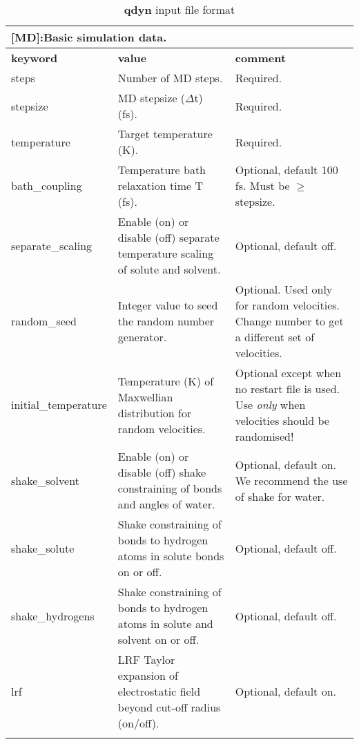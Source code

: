 \documentclass[a4paper,10pt]{article}
\begin{document}
\begin{longtable}{|p{78pt}|p{158pt}|p{158pt}|}
\caption{\textbf{qdyn} input file format}
\label{tab:qdyninputfileformat}
\endhead

\multicolumn{3}{p{394pt}}{[\textbf{MD}]:Basic simulation data.}\\
\hline \textbf{keyword} & \textbf{value} & \textbf{comment}\\
\hline steps & Number of MD steps. & Required.\\
\hline stepsize & MD stepsize ($\Delta$t) (fs). & Required.\\
\hline temperature & Target temperature (K). & Required.\\
\hline bath\_coupling & Temperature bath relaxation time T (fs)\cite{Berendsen:1984}. & Optional, default 100 fs. Must be $\geq$ stepsize. \\
\hline separate\_scaling & Enable (on) or disable (off) separate temperature scaling of solute and solvent. & Optional, default off. \\
\hline random\_seed & Integer value to seed the random number generator. & Optional. Used only for random velocities. Change number to get a different set of velocities.\\
\hline initial\_temperature & Temperature (K) of Maxwellian distribution for random velocities. & Optional except when no restart file is used. Use \emph{only} when velocities should be randomised!\\
\hline shake\_solvent & Enable (on) or disable (off) shake constraining of bonds and angles of water. & Optional, default on. We recommend the use of shake for water.\\
\hline shake\_solute & Shake constraining of bonds to hydrogen atoms in solute bonds on or off. & Optional, default off.\\
\hline shake\_hydrogens & Shake constraining of bonds to hydrogen atoms in solute and solvent on or off.  & Optional, default off. \\
\hline lrf & LRF Taylor expansion of electrostatic field beyond cut-off radius (on/off). & Optional, default on.\\
\hline
\multicolumn{3}{p{394pt}}{}\\


\end{longtable}
\end{document}
